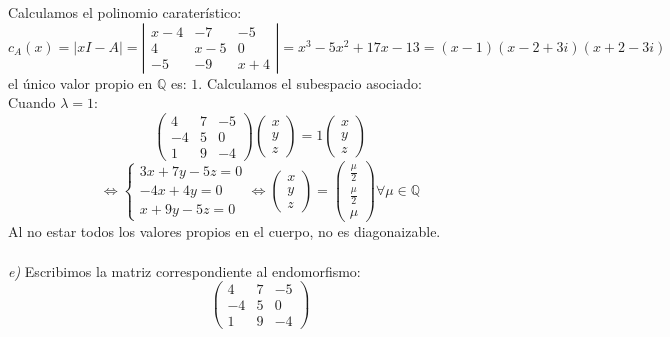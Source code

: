 \documentclass{article}
\begin{document}
Calculamos el polinomio caraterístico:
$$
c_A(x) = |xI-A| = 
\left| \begin{array}{ccc}
    x-4 & -7 & -5\\
    4 & x-5 & 0\\
    -5 & -9 & x+4
\end{array} \right| =
x^3-5x^2+17x-13 = (x-1)(x-2+3i)(x+2-3i)
$$
el único valor propio en $\mathbb{Q}$ es: $1$. Calculamos el subespacio asociado:\\
Cuando $\lambda=1$:
$$
\left( \begin{array}{ccc}
    4 & 7 & -5\\
    -4 & 5 & 0\\
    1 & 9 & -4
\end{array} \right)
\left( \begin{array}{c}
      x \\
      y \\
      z
\end{array} \right) = 1
\left( \begin{array}{c}
      x \\
      y \\
      z
\end{array} \right)
$$
$$
\Leftrightarrow \left\{ \begin{array}{c}
     3x+7y-5z =0  \\
     -4x+4y =0  \\
     x+9y-5z =0
\end{array} \right.
\Leftrightarrow \left( \begin{array}{c}
      x \\
      y \\
      z
\end{array} \right) =
\left( \begin{array}{c}
      \frac{\mu}{2} \\
      \frac{\mu}{2} \\
      \mu
\end{array} \right) \forall \mu \in \mathbb{Q}
$$
Al no estar todos los valores propios en el cuerpo, no es diagonaizable.\\\\
%
%
%
%
\textit{e)}
Escribimos la matriz correspondiente al endomorfismo:\\
$$
\left( \begin{array}{ccc}
    4 & 7 & -5\\
    -4 & 5 & 0\\
    1 & 9 & -4
\end{array} \right)
$$
\end{document}
